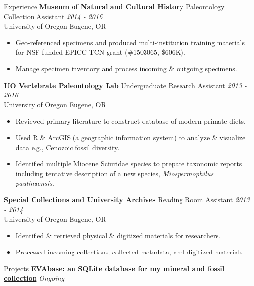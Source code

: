 \documentclass{resume} %
\begin{document}
\begin{rSection}{Experience}
		{\bf Museum of Natural and Cultural History }{Paleontology Collection Assistant} \hfill {\em 2014 - 2016} \\
		{University of Oregon} \hfill {Eugene, OR} 
		\begin{itemize}
			\itemsep -0.5em \vspace{-0.5em} \small
			\item Geo-referenced specimens and produced multi-institution training materials for NSF-funded EPICC TCN grant (\#1503065, \$606K).
			\item Manage specimen inventory and process incoming \& outgoing specimens.
		\end{itemize}
		
		{\bf UO Vertebrate Paleontology Lab }{Undergraduate Research Assistant} \hfill {\em 2013 - 2016} \\
		{University of Oregon} \hfill {Eugene, OR} 
		\begin{itemize}
			\itemsep -0.5em \vspace{-0.5em} \small
			\item Reviewed primary literature to construct database of modern primate diets.
			\item Used R \& ArcGIS (a geographic information system) to analyze \& visualize data e.g., Cenozoic fossil diversity.
			\item Identified multiple Miocene Sciuridae species to prepare taxonomic reports including tentative description of a new species, {\em Miospermophilus paulinaensis}.
		\end{itemize}

		{\bf Special Collections and University Archives }{Reading Room Assistant} \hfill {\em 2013 - 2014} \\
		{University of Oregon} \hfill {Eugene, OR}	
		\begin{itemize}
			\itemsep -0.5em \vspace{-0.5em} \small
			\item Identified \& retrieved physical \& digitized materials for researchers.
			\item Processed incoming collections, collected metadata, and digitized materials.
		\end{itemize}	
	\end{rSection}

	\begin{rSection}{Projects}
		\href{https://github.com/Eva-Biedron/EVAbase}{\bf EVAbase: an SQLite database for my mineral and fossil collection} \hfill {\em Ongoing}
		\\
		\\
		\\
	\end{rSection}
\end{document}

